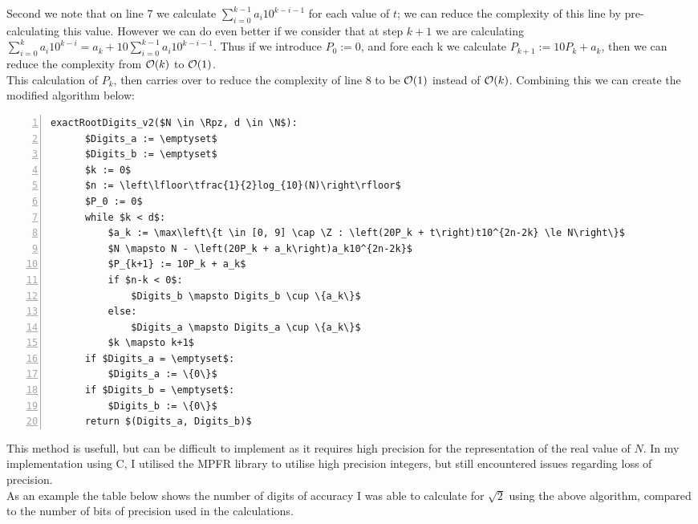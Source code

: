 Second we note that on line 7 we calculate \(\sum_{i=0}^{k-1}a_i10^{k-i-1}\) for each value of \(t\); we can reduce the complexity of this line by pre-calculating this value. However we can do even better if we consider that at step \(k+1\) we are calculating \(\sum_{i=0}^{k}a_i10^{k-i} = a_k + 10\sum_{i=0}^{k-1}a_i10^{k-i-1}\). Thus if we introduce \(P_0 := 0\), and fore each k we calculate \(P_{k+1} := 10P_k + a_k\), then we can reduce the complexity from \(\mathcal{O}(k)\) to \(\mathcal{O}(1)\).\\

This calculation of \(P_k\), then carries over to reduce the complexity of line 8 to be \(\mathcal{O}(1)\) instead of \(\mathcal{O}(k)\). Combining this we can create the modified algorithm below:

\begin{lstlisting}[numbers=left,frame=single,mathescape,caption={Exact Digit by Digits Square Root version 2}]
  exactRootDigits_v2($N \in \Rpz, d \in \N$):
      $Digits_a := \emptyset$
      $Digits_b := \emptyset$
      $k := 0$
      $n := \left\lfloor\tfrac{1}{2}log_{10}(N)\right\rfloor$
      $P_0 := 0$
      while $k < d$:
          $a_k := \max\left\{t \in [0, 9] \cap \Z : \left(20P_k + t\right)t10^{2n-2k} \le N\right\}$
          $N \mapsto N - \left(20P_k + a_k\right)a_k10^{2n-2k}$
          $P_{k+1} := 10P_k + a_k$
          if $n-k < 0$:
              $Digits_b \mapsto Digits_b \cup \{a_k\}$
          else:
              $Digits_a \mapsto Digits_a \cup \{a_k\}$
          $k \mapsto k+1$
      if $Digits_a = \emptyset$:
          $Digits_a := \{0\}$
      if $Digits_b = \emptyset$:
          $Digits_b := \{0\}$
      return $(Digits_a, Digits_b)$
\end{lstlisting}

This method is usefull, but can be difficult to implement as it requires high precision for the representation of the real value of \(N\). In my implementation using C, I utilised the MPFR library to utilise high precision integers, but still encountered issues regarding loss of precision.\\

As an example the table below shows the number of digits of accuracy I was able to calculate for \(\sqrt{2}\) using the above algorithm, compared to the number of bits of precision used in the calculations.\\

